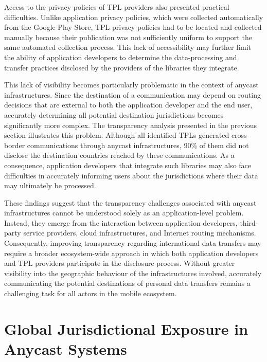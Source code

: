 Access to the privacy policies of TPL providers also presented practical difficulties. Unlike application privacy policies, which were collected automatically from the Google Play Store, TPL privacy policies had to be located and collected manually because their publication was not sufficiently uniform to support the same automated collection process. This lack of accessibility may further limit the ability of application developers to determine the data-processing and transfer practices disclosed by the providers of the libraries they integrate.

This lack of visibility becomes particularly problematic in the context of anycast infrastructures. Since the destination of a communication may depend on routing decisions that are external to both the application developer and the end user, accurately determining all potential destination jurisdictions becomes significantly more complex. The transparency analysis presented in the previous section illustrates this problem. Although all identified TPLs generated cross-border communications through anycast infrastructures, 90\% of them did not disclose the destination countries reached by these communications. As a consequence, application developers that integrate such libraries may also face difficulties in accurately informing users about the jurisdictions where their data may ultimately be processed.

These findings suggest that the transparency challenges associated with anycast infrastructures cannot be understood solely as an application-level problem. Instead, they emerge from the interaction between application developers, third-party service providers, cloud infrastructures, and Internet routing mechanisms. Consequently, improving transparency regarding international data transfers may require a broader ecosystem-wide approach in which both application developers and TPL providers participate in the disclosure process. Without greater visibility into the geographic behaviour of the infrastructures involved, accurately communicating the potential destinations of personal data transfers remains a challenging task for all actors in the mobile ecosystem.

\section{Global Jurisdictional Exposure in Anycast Systems}
\label{sc:anycast_experiments_global_anycast}

